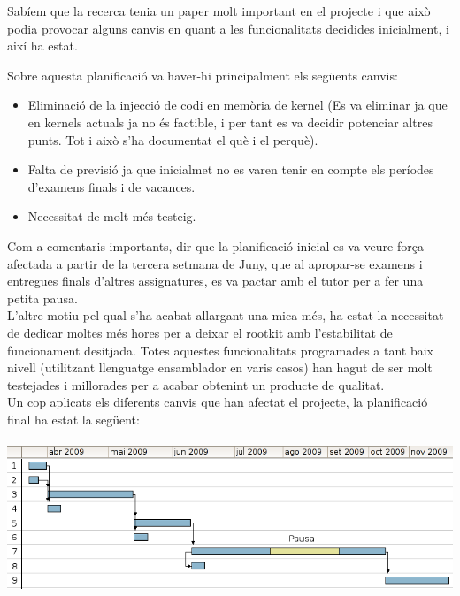Sabíem que la recerca tenia un paper molt important en el projecte i que això podia provocar alguns canvis en quant a
les funcionalitats decidides inicialment, i així ha estat.

Sobre aquesta planificació va haver-hi principalment els següents canvis:

\begin{itemize}
    \item Eliminació de la injecció de codi en memòria de kernel (Es va eliminar ja que en kernels actuals ja no 
        és factible, i per tant es va decidir potenciar altres punts. Tot i això s'ha documentat el què i el perquè).
    \item Falta de previsió ja que inicialmet no es varen tenir en compte els períodes d'examens finals i de 
		vacances.
	\item Necessitat de molt més testeig.
\end{itemize}

Com a comentaris importants, dir que la planificació inicial es va veure força afectada a partir de la tercera setmana de Juny, que al apropar-se
examens i entregues finals d'altres assignatures, es va pactar amb el tutor per a fer una petita pausa. \\

L'altre motiu pel qual s'ha acabat allargant una mica més, ha estat la necessitat de dedicar moltes més hores per a 
deixar el rootkit amb l'estabilitat de funcionament desitjada. Totes aquestes funcionalitats programades a tant 
baix nivell (utilitzant llenguatge ensamblador en varis casos) han hagut de ser molt testejades i millorades per a
acabar obtenint un producte de qualitat. \\

Un cop aplicats els diferents canvis que han afectat el projecte, la planificació final ha estat la següent: \\
\\
\includegraphics[scale=0.68,keepaspectratio]{segon_gantt.png} 

